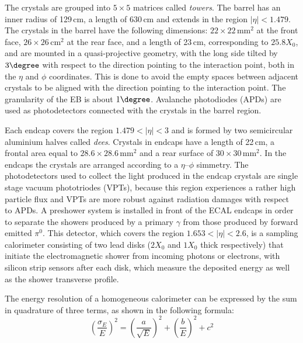 The crystals are grouped into $5\times5$ matrices called \emph{towers}. The barrel has an inner radius of 129\,cm, a length of 630\,cm and extends in the region $|\eta|<1.479$. The crystals in the barrel have the following dimensions: $22\times22\,\mathrm{mm^2}$ at the front face, $26\times26\,\mathrm{cm^2}$ at the rear face, and a length of 23\,cm, corresponding to $25.8 X_0$, and are mounted in a quasi-projective geometry, with the long side tilted by $3\degree$ with respect to the direction pointing to the interaction point, both in the $\eta$ and $\phi$ coordinates. This is done to avoid the empty spaces between adjacent crystals to be aligned with the direction pointing to the interaction point. The granularity of the EB is about $1\degree$.
Avalanche photodiodes (APDs) are used as photodetectors connected with the crystals in the barrel region.

Each endcap covers the region $1.479 < |\eta| < 3$ and is formed by two semicircular aluminium halves called \emph{dees}. Crystals in endcaps have a length of 22\,cm, a frontal area equal to $28.6\times 28.6\,\mathrm{mm^2}$ and a rear surface of $30\times 30\,\mathrm{mm^2}$. In the endcaps the crystals are arranged according to a $\eta$--$\phi$ simmetry. The photodetectors used to collect the light produced in the endcap crystals are single stage vacuum phototriodes (VPTs), because this region experiences a rather high particle flux and VPTs are more robust against radiation damages with respect to APDs. A preshower system is installed in front of the ECAL endcaps in order to separate the showers produced by a primary $\gamma$ from those produced by forward emitted $\pi^0$. This detector, which covers the region $1.653<|\eta|<2.6$, is a sampling calorimeter consisting of two lead disks ($2 X_0$ and $1 X_0$ thick respectively) that initiate the electromagnetic shower from incoming photons or electrons, with silicon strip sensors after each disk, which measure the deposited energy as well as the shower transverse profile.

The energy resolution of a homogeneous calorimeter can be expressed by the sum in quadrature of three terms, as shown in the following formula:
\begin{equation}
\left(\frac{\sigma_E}{E}\right)^2 = \left(\frac{a}{\sqrt{E}}\right)^2 + \left(\frac{b}{E}\right)^2 + c^2
\end{equation}

